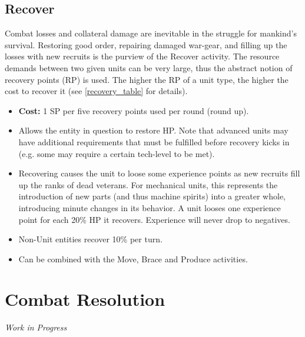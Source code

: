 \subsection{Recover}\label{recover_stance}
Combat losses and collateral damage are inevitable in the struggle for mankind's survival. Restoring good order, repairing damaged war-gear, and filling up the losses with new recruits is the purview of the Recover activity. The resource demands between two given units can be very large, thus the abstract notion of recovery points (RP) is used. The higher the RP of a unit type, the higher the cost to recover it (see \ref{recovery_table} for details).
\begin{itemize}
	\item \textbf{Cost:} 1 SP per five recovery points used per round (round up).
	\item Allows the entity in question to restore HP. Note that advanced units may have additional requirements that must be fulfilled before recovery kicks in (e.g. some may require a certain tech-level to be met).
	\item Recovering causes the unit to loose some experience points as new recruits fill up the ranks of dead veterans. For mechanical units, this represents the introduction of new parts (and thus machine spirits) into a greater whole, introducing minute changes in its behavior. A unit looses one experience point for each 20\% HP it recovers. Experience will never drop to negatives.
	\item Non-Unit entities recover 10\% per turn.
	\item Can be combined with the Move, Brace and Produce activities.
\end{itemize} 

\section{Combat Resolution}
\textit{Work in Progress}

\onecolumn
